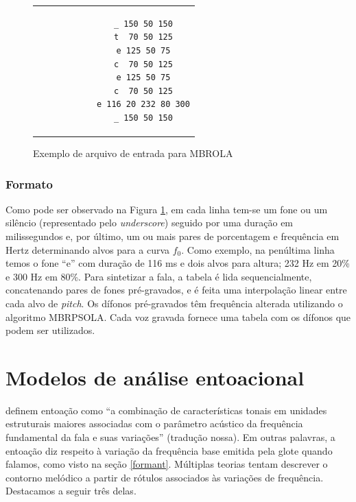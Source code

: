 \begin{figure}[thp] %
    \centering          %
    \begin{tabular}{c}  %
        \begin{lstlisting}
            _ 150 50 150
            t  70 50 125
            e 125 50 75
            c  70 50 125
            e 125 50 75
            c  70 50 125
            e 116 20 232 80 300
            _ 150 50 150
        \end{lstlisting}
    \end{tabular}
    \caption{Exemplo de arquivo de entrada para MBROLA}
    \label{fig:mbr}
\end{figure}

\subsubsection{Formato}
Como pode ser observado na Figura \ref{fig:mbr}, em cada linha tem-se um fone ou um
silêncio (representado pelo \emph{underscore}) seguido por uma duração em
milissegundos e, por último, um ou mais pares de porcentagem e frequência em
Hertz determinando alvos para a curva $ f_0 $. Como exemplo, na penúltima linha temos
o fone ``e'' com duração de 116 ms e dois alvos para altura; 232 Hz em 20\% e
300 Hz em 80\%. Para sintetizar a fala, a tabela é lida sequencialmente,
concatenando pares de fones pré-gravados, e é feita uma interpolação linear
entre cada alvo de \emph{pitch}. Os dífonos pré-gravados têm frequência alterada
utilizando o algoritmo MBRPSOLA. Cada voz gravada fornece uma tabela com os dífonos que podem ser utilizados. 

\section{Modelos de análise entoacional}
\label{entoa}

 definem entoação como ``a combinação de características
tonais em unidades estruturais maiores associadas com o parâmetro acústico da
frequência fundamental da fala e suas variações'' (tradução nossa). Em outras
palavras, a entoação diz respeito à variação da frequência base emitida pela
glote quando falamos, como visto na seção \ref{formant}. Múltiplas teorias
tentam descrever o contorno melódico a partir de rótulos associados às variações
de frequência. Destacamos a seguir três delas.

